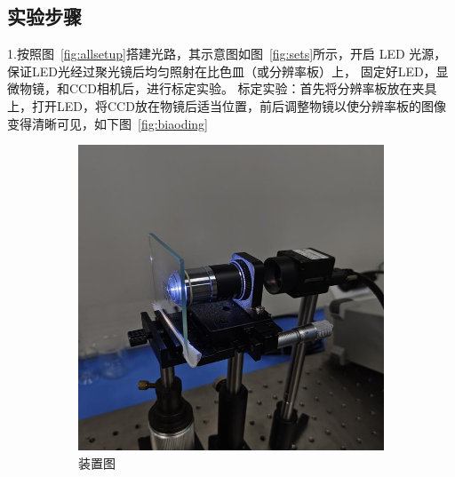 \documentclass[a4paper]{report} %
\begin{document}
\subsection{实验步骤}
1.按照图~\ref{fig:allsetup}搭建光路，其示意图如图~\ref{fig:sets}所示，开启 LED 光源，保证LED光经过聚光镜后均匀照射在比色皿（或分辨率板）上，
固定好LED，显微物镜，和CCD相机后，进行标定实验。
标定实验：首先将分辨率板放在夹具上，打开LED，将CCD放在物镜后适当位置，前后调整物镜以使分辨率板的图像变得清晰可见，如下图~\ref{fig:biaoding}
\begin{figure}[H]
    \centering
    \begin{subfigure}{0.45\textwidth}
        \includegraphics[width=\linewidth]{标定装置.jpg}
        \caption{装置图}
    \end{subfigure}
    \begin{subfigure}{0.45\textwidth}

\end{subfigure}
\end{figure}
\end{document}
